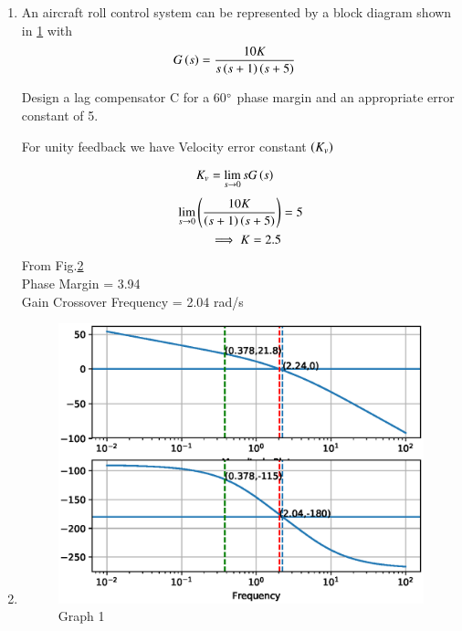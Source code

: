 \begin{enumerate}[label=\thesection.\arabic*.,ref=\thesection.\theenumi]

\item An aircraft roll control system can be represented by a block diagram shown in  \ref{fig:ee18btech11048_block} with
\begin{align}
G\left(s\right) &= \frac{10 K}{s\left(s+1\right)\left(s+5\right)}
\label{eq:ee18btech11048_system}
\end{align}

\begin{figure}[h]
 \centering
     \resizebox{\columnwidth}{!}{}
    \caption{}
    \label{fig:ee18btech11048_block}
\end{figure}
Design a lag compensator C for a 60$\degree $ phase margin and an appropriate error constant of 5.

\solution For unity feedback we have Velocity error constant $\left(K_v\right)$

\begin{align}
K_v &= \lim_{s \to 0} s G\left(s\right) 
\end{align}
\begin{align}
\lim_{s \to 0} \left(\frac{10 K}{\left(s+1\right)\left(s+5\right)} \right)& = 5 \\
\implies K = 2.5
\end{align}
From Fig.\ref{fig: Graph 1}\\
Phase Margin  = 3.94\degree\\
Gain Crossover Frequency = 2.04 rad/s\\
\item 
\begin{figure}[!h]
\centering
  \includegraphics[width=\columnwidth]{./figs/ee18btech11048_1.eps}
  \caption{Graph 1}
  \label{fig: Graph 1}
\end{figure}


\end{enumerate}
